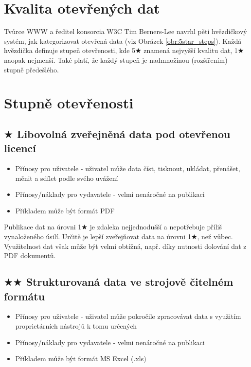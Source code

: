 \newpage

\section{Kvalita otevřených dat}

Tvůrce WWW a ředitel konsorcia W3C Tim Berners-Lee navrhl pěti hvězdičkový systém, jak kategorizovat otevřená data (viz Obrázek \ref{obr:5star_steps}). Každá hvězdička definuje stupeň otevřenosti, kde 5$\bigstar$ znamená nejvyšší kvalitu dat, 1$\bigstar$ naopak nejmenší. Také platí, že každý stupeň je nadmnožinou (rozšířením) stupně předešlého.

\section[Stupně otevřenosti]{Stupně otevřenosti\cite{5starInfo, linkedData}}    

\subsection*{$\bigstar$ Libovolná zveřejněná data pod otevřenou licencí}

\medskip

\begin{itemize}
\item Přínosy pro uživatele - uživatel může data číst, tisknout, ukládat, přenášet, měnit a sdílet podle svého uvážení
\item Přínosy/náklady pro vydavatele - velmi nenáročné na publikaci
\item Příkladem může být formát PDF
\end{itemize}

Publikace dat na úrovni 1$\bigstar$ je zdaleka nejjednodušší a nepotřebuje příliš vynaloženého úsilí. Určitě je lepší zveřejňovat data na úrovni 1$\bigstar$, než vůbec. Využitelnost dat však může být velmi obtížná, např. díky nutnosti dolování dat z PDF dokumentů.

\subsection*{$\bigstar\bigstar$ Strukturovaná data ve strojově čitelném formátu}

\medskip

\begin{itemize}
\item Přínosy pro uživatele - uživatel může pokročile zpracovávat data s využitím proprietárních nástrojů k tomu určených
\item Přínosy/náklady pro vydavatele - velmi nenáročné na publikaci
\item Příkladem může být formát MS Excel (.xls)
\end{itemize}

